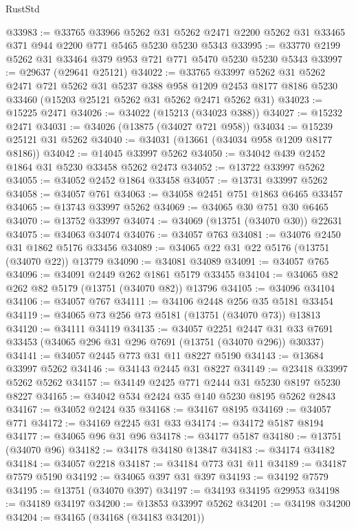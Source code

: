 \begin{lexlean}{RustStd}
\begin{coremodule}
@33983 := @33765
    @33966
    @5262
    @31
    @5262
    @2471
    @2200
    @5262
    @31
    @33465
    @371
    @944
    @2200
    @771
    @5465
    @5230
    @5230
    @5343
@33995 := @33770 @2199 @5262 @31 @33464 @379 @953 @721 @771 @5470 @5230 @5230 @5343
@33997 := @29637 (@29641 @25121)
@34022 := @33765
    @33997
    @5262
    @31
    @5262
    @2471
    @721
    @5262
    @31
    @5237
    @388
    @958
    @1209
    @2453
    @8177
    @8186
    @5230
    @33460
    (@15203 @25121 @5262 @31 @5262 @2471 @5262 @31)
@34023 := @15225 @2471
@34026 := @34022 (@15213 (@34023 @388))
@34027 := @15232 @2471
@34031 := @34026 (@13875 (@34027 @721 @958))
@34034 := @15239 @25121 @31 @5262
@34040 := @34031 (@13661 (@34034 @958 @1209 @8177 @8186))
@34042 := @14045 @33997 @5262
@34050 := @34042 @439 @2452 @1864 @31 @5230 @33458 @5262 @2473
@34052 := @13722 @33997 @5262
@34055 := @34052 @2452 @1864 @33458
@34057 := @13731 @33997 @5262
@34058 := @34057 @761
@34063 := @34058 @2451 @751 @1863 @6465 @33457
@34065 := @13743 @33997 @5262
@34069 := @34065 @30 @751 @30 @6465
@34070 := @13752 @33997
@34074 := @34069 (@13751 (@34070 @30)) @22631
@34075 := @34063 @34074
@34076 := @34057 @763
@34081 := @34076 @2450 @31 @1862 @5176 @33456
@34089 := @34065 @22 @31 @22 @5176 (@13751 (@34070 @22)) @13779
@34090 := @34081 @34089
@34091 := @34057 @765
@34096 := @34091 @2449 @262 @1861 @5179 @33455
@34104 := @34065 @82 @262 @82 @5179 (@13751 (@34070 @82)) @13796
@34105 := @34096 @34104
@34106 := @34057 @767
@34111 := @34106 @2448 @256 @35 @5181 @33454
@34119 := @34065 @73 @256 @73 @5181 (@13751 (@34070 @73)) @13813
@34120 := @34111 @34119
@34135 := @34057
    @2251
    @2447
    @31
    @33
    @7691
    @33453
    (@34065 @296 @31 @296 @7691 (@13751 (@34070 @296)) @30337)
@34141 := @34057 @2445 @773 @31 @11 @8227 @5190
@34143 := @13684 @33997 @5262
@34146 := @34143 @2445 @31 @8227
@34149 := @23418 @33997 @5262 @5262
@34157 := @34149 @2425 @771 @2444 @31 @5230 @8197 @5230 @8227
@34165 := @34042 @534 @2424 @35 @140 @5230 @8195 @5262 @2843
@34167 := @34052 @2424 @35
@34168 := @34167 @8195
@34169 := @34057 @771
@34172 := @34169 @2245 @31 @33
@34174 := @34172 @5187 @8194
@34177 := @34065 @96 @31 @96
@34178 := @34177 @5187
@34180 := @13751 (@34070 @96)
@34182 := @34178 @34180 @13847
@34183 := @34174 @34182
@34184 := @34057 @2218
@34187 := @34184 @773 @31 @11
@34189 := @34187 @7579 @5190
@34192 := @34065 @397 @31 @397
@34193 := @34192 @7579
@34195 := @13751 (@34070 @397)
@34197 := @34193 @34195 @29953
@34198 := @34189 @34197
@34200 := @13853 @33997 @5262
@34201 := @34198 @34200
@34204 := @34165 (@34168 (@34183 @34201))

\end{coremodule}
\end{lexlean}
